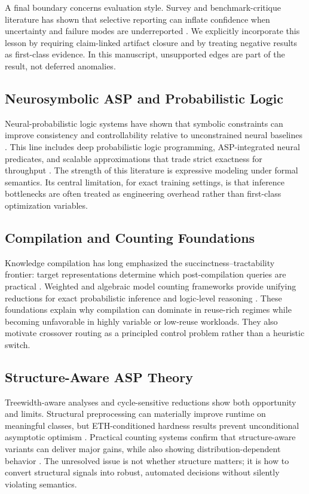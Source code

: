 \documentclass{article} %
\begin{document}
A final boundary concerns evaluation style. Survey and benchmark-critique literature has shown that selective reporting can inflate confidence when uncertainty and failure modes are underreported \citep{src_028,src_029,src_035,src_041,src_042,src_043,src_044}. We explicitly incorporate this lesson by requiring claim-linked artifact closure and by treating negative results as first-class evidence. In this manuscript, unsupported edges are part of the result, not deferred anomalies.

\subsection{Neurosymbolic ASP and Probabilistic Logic}
Neural-probabilistic logic systems have shown that symbolic constraints can improve consistency and controllability relative to unconstrained neural baselines \citep{src_010,src_011,src_012,src_014,src_016,src_019}. This line includes deep probabilistic logic programming, ASP-integrated neural predicates, and scalable approximations that trade strict exactness for throughput \citep{src_013,src_015,src_033,src_040}. The strength of this literature is expressive modeling under formal semantics. Its central limitation, for exact training settings, is that inference bottlenecks are often treated as engineering overhead rather than first-class optimization variables.

\subsection{Compilation and Counting Foundations}
Knowledge compilation has long emphasized the succinctness--tractability frontier: target representations determine which post-compilation queries are practical \citep{src_002,src_003,src_006,src_008}. Weighted and algebraic model counting frameworks provide unifying reductions for exact probabilistic inference and logic-level reasoning \citep{src_004,src_007,src_009,src_022,src_023,src_024,src_039}. These foundations explain why compilation can dominate in reuse-rich regimes while becoming unfavorable in highly variable or low-reuse workloads. They also motivate crossover routing as a principled control problem rather than a heuristic switch.

\subsection{Structure-Aware ASP Theory}
Treewidth-aware analyses and cycle-sensitive reductions show both opportunity and limits. Structural preprocessing can materially improve runtime on meaningful classes, but ETH-conditioned hardness results prevent unconditional asymptotic optimism \citep{src_045,src_046,src_047,src_048}. Practical counting systems confirm that structure-aware variants can deliver major gains, while also showing distribution-dependent behavior \citep{src_039,src_045}. The unresolved issue is not whether structure matters; it is how to convert structural signals into robust, automated decisions without silently violating semantics.
\end{document}
